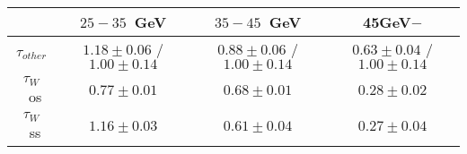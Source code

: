 \centering
\begin{tabular}{|c|c|c|c|} \hline
 & $25-35$~GeV & $35-45$~GeV & 45GeV$-$\\\hline
$\tau_{other}$ & $1.18\pm0.06$ / $1.00\pm0.14$ & $0.88\pm0.06$ / $1.00\pm0.14$ & $0.63\pm0.04$ / $1.00\pm0.14$\\\hline
$\tau_{W}$~os & $0.77\pm0.01$ & $0.68\pm0.01$ & $0.28\pm0.02$\\\hline
$\tau_{W}$~ss & $1.16\pm0.03$ & $0.61\pm0.04$ & $0.27\pm0.04$\\\hline
\end{tabular}

